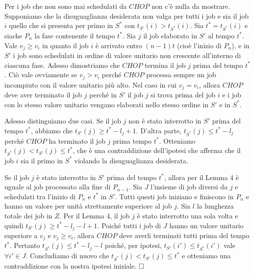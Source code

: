 \documentclass[12pt]{article}
\begin{document}
Per i job che non sono mai schedulati da $CHOP$ non c'è nulla da mostrare. Supponiamo che la disuguaglianza desiderata non valga per tutti i job e sia il job $i$ quello che si presenta per primo in $S^{*}$ con $t_{S'}(i) > t_{S^{*}}(i)$. Sia $t^{*} = t_{S^{*}}(i)$ e siache $P_{n}$ la fase contenente il tempo $t^{*}$. Sia $j$ il job elaborato in $S'$ al tempo $t^{*}$. Vale $v_{j} \geq v_{i}$ in quanto il job $i$ è arrivato entro $(n - 1)t$ (cioè l'inizio di $P_{n}$), e in $S'$ i job sono schedulati in ordine di valore unitario non crescente all'interno di ciascuna fase. Adesso dimostriamo che $CHOP$ termina il job $j$ prima del tempo $t^{*}$. Ciò vale ovviamente se $v_{j} > v_{i}$ perché $CHOP$ processa sempre un job incompiuto con il valore unitario più alto. Nel caso in cui $v_{j} = v_{i}$, allora $CHOP$ deve aver terminato il job $j$ perché in $S'$ il job $j$ si trova prima del job $i$ e i job con lo stesso valore unitario vengano elaborati nello stesso ordine in $S'$ e in $S^{*}$. 

Adesso distinguiamo due casi. Se il job $j$ non è stato interrotto in $S'$ prima del tempo $t^{*}$, abbiamo che $t_{S'}(j) \geq t^{*} - l_{j} + 1$. D'altra parte, $t_{S^{*}}(j) \leq t^{*} - l_{j}$ perché $CHOP$ ha terminato il job $j$ prima tempo $t^{*}$. Otteniamo $t_{S^{*}}(j) < t_{S'}(j) \leq t^{*}$, che è una contraddizione dell'ipotesi che afferma che il job $i$ sia il primo in $S^{*}$ violando la disuguaglianza desiderata. 

Se il job $j$ è stato interrotto in $S'$ prima del tempo $t^{*}$, allora per il Lemma 4 è uguale al job processato alla fine di $P_{n - 1}$. Sia $J$ l'insieme di job diversi da $j$ e schedulati tra l'inizio di $P_{n}$ e $t^{*}$ in $S'$. Tutti questi job iniziano e finiscono in $P_{n}$ e hanno un valore per unità strettamente superiore al job $j$. Sia $l$ la lunghezza totale dei job in $Z$. Per il Lemma 4, il job $j$ è stato interrotto una sola volta e quindi $t_{S'}(j) \geq t^{*} - l_{j} - l + 1$. Poiché tutti i job di $J$ hanno un valore unitario superiore a $v_{j}$ e $v_{j} \geq v_{i}$, allora $CHOP$ deve averli terminati tutti prima del tempo $t^{*}$. Pertanto $t_{S^{*}}(j) \leq t^{*} - l_{j} - l$ poiché, per ipotesi, $t_{S'}(i') \leq t_{S^{*}}(i')$ vale $\forall i' \in J$. Concludiamo di nuovo che $t_{S^{*}}(j) < t_{S'}(j) \leq t^{*}$ e otteniamo una contraddizione con la nostra ipotesi iniziale. $\hfill \square$
\newline
\end{document}
